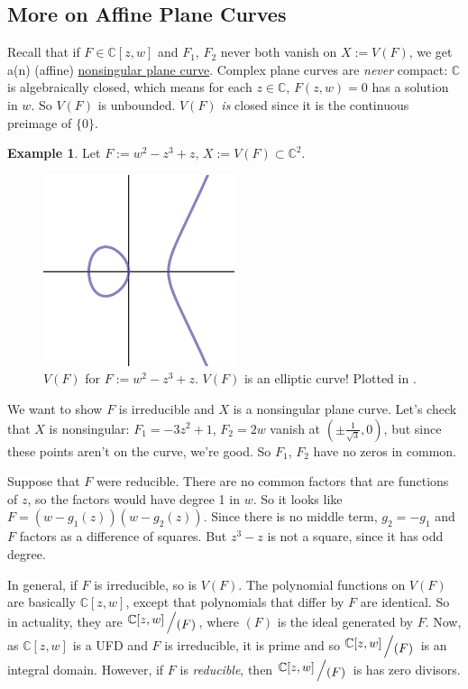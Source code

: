 \documentclass[12pt]{article}
\newcommand{\cx}{\mathbb{C}}
\newcommand{\ita}[1]{\textit{#1}}
\newcommand{\quotient}[2]{{\raisebox{.2em}{$#1$}\left/\raisebox{-.2em}{$#2$}\right.}}
\theoremstyle{definition}
\newtheorem{example}[theorem]{Example}
\theoremstyle{remark}
\begin{document}
\subsection{More on Affine Plane Curves}
Recall that if $F\in\cx[z,w]$ and $F_1$, $F_2$ never both vanish on $X:=V(F)$, we get a(n) (affine) \underline{nonsingular plane curve}. Complex plane curves are \ita{never} compact: $\cx$ is algebraically closed, which means for each $z\in\cx$, $F(z,w)=0$ has a solution in $w$. So $V(F)$ is unbounded. $V(F)$ \ita{is} closed since it is the continuous preimage of $\{0\}$. 
\begin{example}
    Let $F:=w^2-z^3+z$, $X:=V(F)\subset\cx^2$. 
    \begin{figure}[H]
        \centering
        \includegraphics[width=0.5\textwidth]{9.png}
        \caption{$V(F)$ for $F:=w^2-z^3+z$. $V(F)$ is an elliptic curve! Plotted in \cite{Desmos}.}
        \label{fig:Fig9}
    \end{figure}
    We want to show $F$ is irreducible and $X$ is a nonsingular plane curve. Let's check that $X$ is nonsingular: $F_1=-3z^2+1$, $F_2=2w$ vanish at $\left(\pm\frac{1}{\sqrt{3}},0\right)$, but since these points aren't on the curve, we're good. So $F_1$, $F_2$ have no zeros in common. 
    
    Suppose that $F$ were reducible. There are no common factors that are functions of $z$, so the factors would have degree 1 in $w$. So it looks like $F=(w-g_1(z))(w-g_2(z))$. Since there is no middle term, $g_2=-g_1$ and $F$ factors as a difference of squares. But $z^3-z$ is not a square, since it has odd degree.
\end{example}
In general, if $F$ is irreducible, so is $V(F)$. The polynomial functions on $V(F)$ are basically $\cx[z,w]$, except that polynomials that differ by $F$ are identical. So in actuality, they are $\quotient{\cx[z,w]}{(F)}$, where $(F)$ is the ideal generated by $F$. Now, as $\cx[z,w]$ is a UFD and $F$ is irreducible, it is prime and so $\quotient{\cx[z,w]}{(F)}$ is an integral domain. However, if $F$ is \ita{reducible}, then $\quotient{\cx[z,w]}{(F)}$ is has zero divisors.
\end{document}
